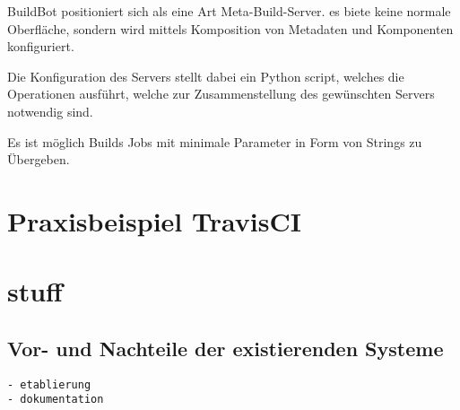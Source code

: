 BuildBot positioniert sich als eine Art Meta-Build-Server.
es biete keine normale Oberfläche, sondern wird mittels
Komposition von Metadaten und Komponenten konfiguriert.

Die Konfiguration des Servers stellt dabei ein Python script,
welches die Operationen ausführt, welche zur Zusammenstellung des gewünschten Servers notwendig sind.

Es ist möglich Builds Jobs mit minimale Parameter in Form von Strings zu Übergeben.

\section{Praxisbeispiel TravisCI}

\section{stuff}

\subsection{Vor- und Nachteile der existierenden Systeme}

\begin{verbatim}
- etablierung
- dokumentation
\end{verbatim}


